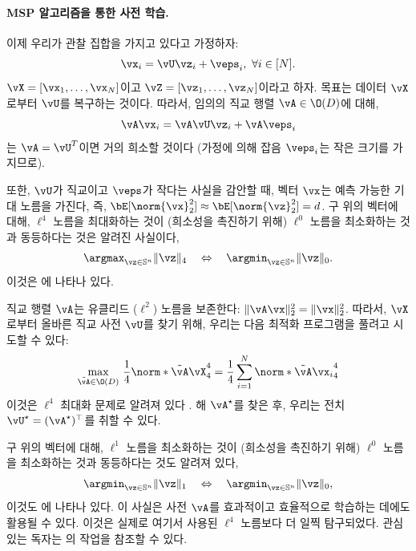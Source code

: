 \documentclass[../../book-main_ko.tex]{subfiles}
\begin{document}
\paragraph{MSP 알고리즘을 통한 사전 학습.}

이제 우리가 관찰 집합을 가지고 있다고 가정하자:
\begin{equation}
    \vx_i = \vU \vz_i + \veps_i,\ \forall i \in [N].
\end{equation}
\(\vX = [\vx_1, \dots, \vx_N]\)이고 \(\vZ = [\vz_1, \dots, \vz_N]\)이라고 하자. 목표는 데이터 \(\vX\)로부터 \(\vU\)를 복구하는 것이다. 따라서, 임의의 직교 행렬 \(\vA \in \O(D)\)에 대해,
\begin{equation}
    \vA\vx_i = \vA\vU \vz_i + \vA\veps_i
\end{equation}
는 \(\vA = \vU^T\)이면 거의 희소할 것이다 (가정에 의해 잡음 \(\veps_i\)는 작은 크기를 가지므로).

또한, \(\vU\)가 직교이고 \(\veps\)가 작다는 사실을 감안할 때, 벡터 \(\vx\)는 예측 가능한 기대 노름을 가진다, 즉, \(\bE[\norm{\vx}_2^2] \approx \bE[\norm{\vz}_2^2]=d\). 구 위의 벡터에 대해, \(\ell^4\) 노름을 최대화하는 것이 (희소성을 촉진하기 위해) \(\ell^0\) 노름을 최소화하는 것과 동등하다는 것은 알려진 사실이다,
\begin{equation}
    \argmax_{\vz \in \mathbb{S}^n}\|\vz\|_{4}\quad\Leftrightarrow\quad \argmin_{\vz \in \mathbb{S}^n}\|\vz\|_{0}.
\end{equation}
이것은 에 나타나 있다.

직교 행렬 \(\vA\)는 유클리드 (\(\ell^{2}\)) 노름을 보존한다: \(\|\vA \vx\|_2^2 = \|\vx\|_2^2\). 따라서, \(\vX\)로부터 올바른 직교 사전 \(\vU\)를 찾기 위해, 우리는 다음 최적화 프로그램을 풀려고 시도할 수 있다:
\begin{equation}\label{eq0:orthogonal-dictionary-learning-l4}
    \max_{\tilde{\vA} \in \O(D)}\,
     \frac{1}{4} \norm*{
    \tilde{\vA} \vX
    }_4^4 =  \frac{1}{4} \sum_{i=1}^N \norm*{
        \tilde{\vA} \vx_i
    }_4^4
\end{equation}
이것은 \(\ell^4\) 최대화 문제로 알려져 있다 \cite{Zhai-2020}. 해 \(\vA^{\star}\)를 찾은 후, 우리는 전치 \(\vU^{\star} = (\vA^{\star})^{\top}\)를 취할 수 있다.
\begin{remark}
    구 위의 벡터에 대해, \(\ell^1\) 노름을 최소화하는 것이 (희소성을 촉진하기 위해) \(\ell^0\) 노름을 최소화하는 것과 동등하다는 것도 알려져 있다,
\begin{equation*}
            \argmin_{\vz \in \mathbb{S}^n}\|\vz\|_{1}\quad\Leftrightarrow\quad \argmin_{\vz \in \mathbb{S}^n}\|\vz\|_{0},
\end{equation*}
이것도 에 나타나 있다. 이 사실은 사전 \(\vA\)를 효과적이고 효율적으로 학습하는 데에도 활용될 수 있다. 이것은 실제로 여기서 사용된 \(\ell^4\) 노름보다 더 일찍 탐구되었다. 관심 있는 독자는 \cite{qu2020findingsparsestvectorssubspace}의 작업을 참조할 수 있다.
\end{remark}
\end{document}
